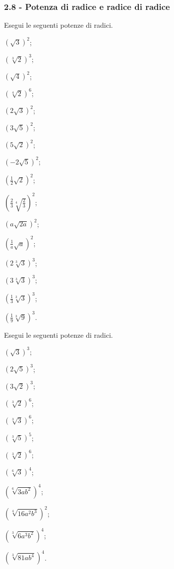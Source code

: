 \subsubsection*{2.8 - Potenza di radice e radice di radice}

\begin{esercizio}[\Ast]
 \label{ese:2.58}
Esegui le seguenti potenze di radici.
 \begin{multicols}{4}
 \begin{enumeratea}
 \item $\left(\sqrt 3\right)^2$;
 \item $\left(\sqrt[3]2\right)^3$;
 \item $\left(\sqrt 4\right)^2$;
 \item $\left(\sqrt[4]2\right)^6$;
 \item $\left(2\sqrt 3\right)^2$;
 \item $\left(3\sqrt 5\right)^2$;
 \item $\left(5\sqrt 2\right)^2$;
 \item $\left(-2\sqrt 5\right)^2$;
 \item $\left(\frac 1 2\sqrt 2\right)^2$;
 \item $\left(\frac 2 3\sqrt[4]{\frac 2 3}\right)^2$;
 \item $\left(a\sqrt{2a}\right)^2$;
 \item $\left(\frac 1 a\sqrt a\right)^2$;
 \item $\left(2\sqrt[3]3\right)^3$;
 \item $\left(3\sqrt[3]3\right)^3$;
 \item $\left(\frac 1 3\sqrt[3]3\right)^3$;
 \item $\left(\frac 1 9\sqrt[3]9\right)^3$.
 \end{enumeratea}
 \end{multicols}
\end{esercizio}

\begin{esercizio}[\Ast]
 \label{ese:2.59}
Esegui le seguenti potenze di radici.
 \begin{multicols}{4}
 \begin{enumeratea}
 \item $\left(\sqrt 3\right)^3$;
 \item $\left(2\sqrt 5\right)^3$;
 \item $\left(3\sqrt 2\right)^3$;
 \item $\left(\sqrt[3]2\right)^6$;
 \item $\left(\sqrt[3]3\right)^6$;
 \item $\left(\sqrt[3]5\right)^5$;
 \item $\left(\sqrt[3]2\right)^6$;
 \item $\left(\sqrt[6]3\right)^4$;
 \item $\left(\sqrt[6]{3ab^2}\right)^4$;
 \item $\left(\sqrt[4]{16a^2b^3}\right)^2$;
 \item $\left(\sqrt[3]{6a^3b^2}\right)^4$;
 \item $\left(\sqrt[3]{81ab^4}\right)^4$.
 \end{enumeratea}
 \end{multicols}
\end{esercizio}


